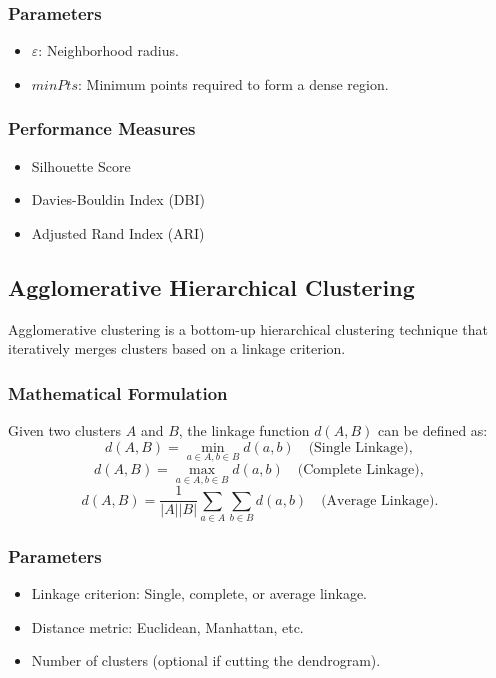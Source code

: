 \documentclass{article}
\begin{document}
\subsubsection{Parameters}
\begin{itemize}
    \item $\varepsilon$: Neighborhood radius.
    \item $minPts$: Minimum points required to form a dense region.
\end{itemize}

\subsubsection{Performance Measures}
\begin{itemize}
    \item Silhouette Score
    \item Davies-Bouldin Index (DBI)
    \item Adjusted Rand Index (ARI)
\end{itemize}

\subsection{Agglomerative Hierarchical Clustering}
Agglomerative clustering is a bottom-up hierarchical clustering technique that iteratively merges clusters based on a linkage criterion.

\subsubsection{Mathematical Formulation}
Given two clusters $A$ and $B$, the linkage function $d(A, B)$ can be defined as:
\begin{equation}
d(A, B) = \min_{a \in A, b \in B} d(a, b) \quad \text{(Single Linkage)},
\end{equation}
\begin{equation}
d(A, B) = \max_{a \in A, b \in B} d(a, b) \quad \text{(Complete Linkage)},
\end{equation}
\begin{equation}
d(A, B) = \frac{1}{|A| |B|} \sum_{a \in A} \sum_{b \in B} d(a, b) \quad \text{(Average Linkage)}.
\end{equation}

\subsubsection{Parameters}
\begin{itemize}
    \item Linkage criterion: Single, complete, or average linkage.
    \item Distance metric: Euclidean, Manhattan, etc.
    \item Number of clusters (optional if cutting the dendrogram).
\end{itemize}
\end{document}
